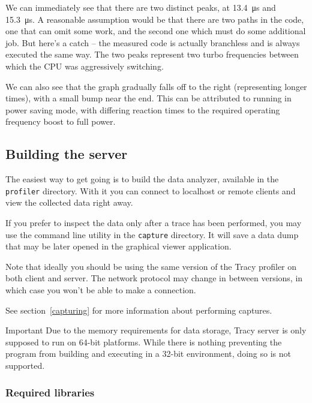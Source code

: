 \documentclass[hidelinks,titlepage,a4paper]{article}
\begin{document}
We can immediately see that there are two distinct peaks, at 13.4~\si{\micro\second} and 15.3~\si{\micro\second}. A reasonable assumption would be that there are two paths in the code, one that can omit some work, and the second one which must do some additional job. But here's a catch -- the measured code is actually branchless and is always executed the same way. The two peaks represent two turbo frequencies between which the CPU was aggressively switching.

We can also see that the graph gradually falls off to the right (representing longer times), with a small bump near the end. This can be attributed to running in power saving mode, with differing reaction times to the required operating frequency boost to full power.

\subsection{Building the server}

The easiest way to get going is to build the data analyzer, available in the \texttt{profiler} directory. With it you can connect to localhost or remote clients and view the collected data right away.

If you prefer to inspect the data only after a trace has been performed, you may use the command line utility in the \texttt{capture} directory. It will save a data dump that may be later opened in the graphical viewer application.

Note that ideally you should be using the same version of the Tracy profiler on both client and server. The network protocol may change in between versions, in which case you won't be able to make a connection.

See section~\ref{capturing} for more information about performing captures.

\begin{bclogo}[
noborder=true,
couleur=black!5,
logo=\bcbombe
]{Important}
Due to the memory requirements for data storage, Tracy server is only supposed to run on 64-bit platforms. While there is nothing preventing the program from building and executing in a 32-bit environment, doing so is not supported.
\end{bclogo}

\subsubsection{Required libraries}
\end{document}
